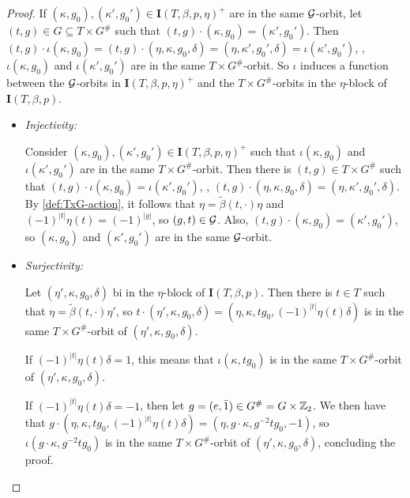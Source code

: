 \begin{proof}
	If $(\kappa, g_0), (\kappa', g_0') \in \mathbf{I}(T, \beta, p, \eta)^+$ are in the same $\mathcal G$-orbit, let $(t, g) \in G \subseteq T\times G^\#$ such that $(t, g) \cdot (\kappa, g_0) = (\kappa', g_0')$.
	Then $(t, g) \cdot \iota(\kappa, g_0) = (t, g) \cdot (\eta,\kappa, g_0, \delta) =  (\eta,\kappa' , g_0' , \delta) = \iota(\kappa' , g_0')$, \ie, $\iota(\kappa, g_0)$ and $\iota(\kappa', g_0')$ are in the same $T\times G^\#$-orbit.
	So $\iota$ induces a function between the $\mathcal G$-orbits in $\mathbf{I}(T,\beta,p,\eta)^+$ and the $T\times G^\#$-orbits in the $\eta$-block of $\mathbf{I}(T,\beta,p)$.
	\begin{itemize}
		\item \textit{Injectivity:}

		      Consider $(\kappa, g_0), (\kappa', g_0') \in \mathbf{I}(T, \beta, p, \eta)^+$ such that $\iota(\kappa, g_0)$ and $\iota(\kappa', g_0')$ are in the same $T\times G^\#$-orbit.
		      Then there is $(t, g) \in T\times G^\#$ such that $(t, g) \cdot \iota(\kappa, g_0) = \iota(\kappa' , g_0')$, \ie, $(t, g) \cdot (\eta,\kappa, g_0, \delta) =  (\eta,\kappa' , g_0' , \delta)$.
		      By \cref{def:TxG-action}, it follows that $\eta = \tilde\beta(t, \cdot)\eta$ and $(-1)^{|t|}\eta(t) = (-1)^{|g|}$, so $(g, t) \in \mathcal G$.
		      Also, $(t, g) \cdot (\kappa, g_0) = (\kappa', g_0')$, so $(\kappa, g_0)$ and $(\kappa', g_0')$ are in the same $\mathcal G$-orbit.
		\item \textit{Surjectivity:}

		      Let $(\eta', \kappa, g_0, \delta)$ bi in the $\eta$-block of $\mathbf{I}(T, \beta, p)$.
		      Then there is $t\in T$ such that $\eta = \tilde\beta(t, \cdot) \eta'$, so $t\cdot (\eta', \kappa, g_0, \delta) = (\eta, \kappa, t g_0, (-1)^{|t|} \eta(t)\delta)$ is in the same $T\times G^\#$-orbit of $(\eta', \kappa, g_0, \delta)$.

		      If $(-1)^{|t|} \eta(t)\delta = 1$, this means that $\iota(\kappa, t g_0)$ is in the same $T\times G^\#$-orbit of $(\eta', \kappa, g_0, \delta)$.

		      If $(-1)^{|t|} \eta(t)\delta = -1$, then let $g = (e, \bar1) \in G^\#= G\times \mathbb{Z}_2$.
		      We then have that $g\cdot (\eta, \kappa, t g_0, (-1)^{|t|} \eta(t)\delta) = (\eta, g\cdot \kappa, g^{-2} t g_0, -1)$, so $\iota(g\cdot \kappa, g^{-2} t g_0)$ is in the same $T\times G^\#$-orbit of $(\eta', \kappa, g_0, \delta)$, concluding the proof.
	\end{itemize}
\end{proof}

